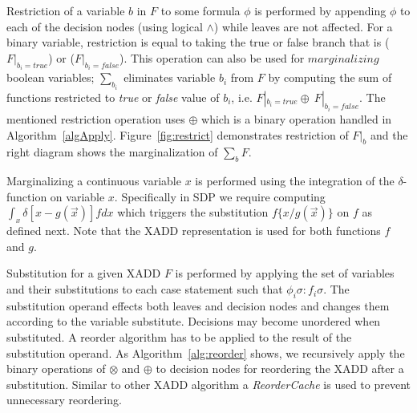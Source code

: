 \documentclass[twoside,11pt]{article}
\begin{document}
Restriction of a variable $b$ in $F$ to some formula $\phi$ is performed by appending $\phi$ to each of the decision nodes (using logical $\wedge$) while leaves are not affected. For a binary variable, restriction is equal to taking the true or false branch that is ($F|_{b_i=true}$) or ($F|_{b_i=false}$). 
This operation can also be used for $\textit{marginalizing}$ boolean variables; $\sum_{b_i}$ eliminates variable $b_i$ from $F$  by computing the sum of functions restricted to \emph{true} or \emph{false} value of $b_i$, i.e. $F|_{b_i=true} \oplus \ F|_{b_i=false}$. The mentioned restriction operation uses $\oplus$ which is a binary operation handled in Algorithm~\ref{algApply}. Figure~\ref{fig:restrict} demonstrates restriction of $F|_{b}$ and the right diagram shows the marginalization of $\sum_{b}F$. 

Marginalizing a continuous variable $x$ is performed using the integration of the $\delta$-function on variable $x$. Specifically in SDP we require computing $\int_{x} \delta [ x - g(\vec{x})]fdx$ which triggers the substitution $f \lbrace x/ g(\vec{x})\rbrace$ on $f$ as defined next. Note that the XADD representation is used for both functions $f$ and $g$.
 
Substitution for a given XADD $F$ is performed by applying the set of variables and their substitutions to each case statement such that $\phi_i\sigma: f_i\sigma$. The substitution operand effects both leaves and decision nodes and changes them according to the variable substitute. 
Decisions may become unordered when substituted. A reorder algorithm has to be applied to the result of the substitution operand. As Algorithm~\ref{alg:reorder} shows, we recursively apply the binary operations of $\otimes$ and $\oplus$ to decision nodes for reordering the XADD after a substitution. Similar to other XADD algorithm a \emph{ReorderCache} is used to prevent unnecessary reordering. 
\end{document}
